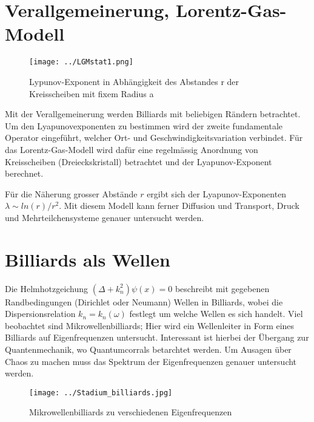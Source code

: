 \documentclass{article}
\begin{document}
 \section{Verallgemeinerung, Lorentz-Gas-Modell}
 
 
  \begin{wrapfigure}{r}{0.5\textwidth}
  \vspace{-10pt}
  \begin{center}
  \texttt{[image: ../LGMstat1.png]}
   \end{center}
   \vspace{-10pt}
   \caption{Lypunov-Exponent in Abhängigkeit des Abstandes r der Kreisscheiben mit fixem Radius a}

  \end{wrapfigure}
  
  Mit der Verallgemeinerung werden Billiards mit beliebigen R\"{a}ndern betrachtet. Um den Lyapunovexponenten zu bestimmen wird der zweite fundamentale Operator eingef\"{u}hrt, welcher Ort- und Geschwindigkeitsvariation verbindet. F\"{u}r das Lorentz-Gas-Modell wird daf\"{u}r eine regelm\"{a}ssig Anordnung von Kreisscheiben (Dreieckskristall) betrachtet und der Lyapunov-Exponent berechnet. 
  
  
  F\"{u}r die N\"{a}herung grosser Abst\"{a}nde $r$ ergibt sich der Lyapunov-Exponenten $\lambda \sim ln(r)/r^2$. Mit diesem Modell kann ferner Diffusion und Transport, Druck und Mehrteilchensysteme genauer untersucht werden.
  
  
 \section{Billiards als Wellen}
 
 Die Helmhotzgeichung $(\Delta + k_n^2)\psi(x)=0$ beschreibt mit gegebenen Randbedingungen (Dirichlet oder Neumann) Wellen in Billiards, wobei die Dispersionsrelation $k_n = k_n(\omega)$ festlegt um welche Wellen es sich handelt. Viel beobachtet sind Mikrowellenbilliards; Hier wird ein Wellenleiter in Form eines Billiards auf Eigenfrequenzen untersucht. Interessant ist hierbei der \"{U}bergang zur Quantenmechanik, wo Quantumcorrals betarchtet werden. Um Ausagen \"{u}ber Chaos zu machen muss das Spektrum der Eigenfrequenzen genauer untersucht werden.
 
     \begin{wrapfigure}{l}{0.5\textwidth}

     \begin{center}
     \texttt{[image: ../Stadium\_billiards.jpg]}
      \end{center}

      \caption{Mikrowellenbilliards zu verschiedenen Eigenfrequenzen}
     \end{wrapfigure}
 
\end{document}
